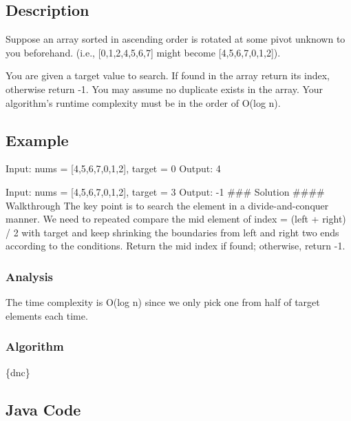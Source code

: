 \documentclass[]{book}
\begin{document}
\hypertarget{description-10}{%
\subsection{Description}\label{description-10}}

Suppose an array sorted in ascending order is rotated at some pivot unknown to you beforehand.
(i.e., {[}0,1,2,4,5,6,7{]} might become {[}4,5,6,7,0,1,2{]}).

You are given a target value to search. If found in the array return its index, otherwise return -1. You may
assume no duplicate exists in the array. Your algorithm's runtime complexity must be in the order of O(log n).

\hypertarget{example-9}{%
\subsection{Example}\label{example-9}}

Input: nums = {[}4,5,6,7,0,1,2{]}, target = 0
Output: 4

Input: nums = {[}4,5,6,7,0,1,2{]}, target = 3
Output: -1
\#\#\# Solution
\#\#\#\# Walkthrough
The key point is to search the element in a divide-and-conquer manner. We need to repeated compare the
mid element of index = (left + right) / 2 with target and keep shrinking the boundaries from left and right two ends
according to the conditions. Return the mid index if found; otherwise, return -1.

\hypertarget{analysis-11}{%
\subsubsection{Analysis}\label{analysis-11}}

The time complexity is O(log n) since we only pick one from half of target elements each time.

\hypertarget{algorithm-11}{%
\subsubsection{Algorithm}\label{algorithm-11}}

\{dnc\}

\hypertarget{java-code-9}{%
\subsection{Java Code}\label{java-code-9}}
\end{document}
